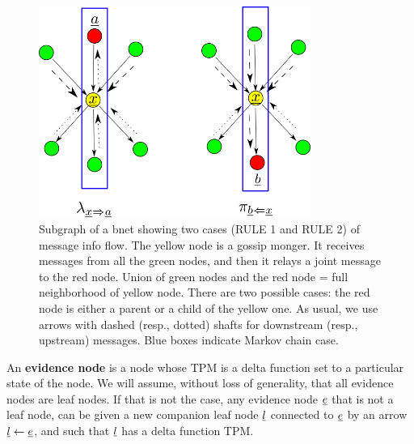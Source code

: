 \begin{figure}[h!]
\centering
\includegraphics[width=3.5in]
{mpass/mpass-messages.png}
\caption{
Subgraph of a bnet
showing two cases (RULE 1
 and RULE 2)
of message info flow.
The yellow
node is a gossip monger.
It receives messages from
all the green nodes,
and then it relays a joint
message to the red node.
Union of green nodes and the red node = full
 neighborhood of yellow node.
There are two possible
cases: the
red node is either a parent
or a child of the yellow
one. As usual, we use arrows with
dashed (resp., dotted) shafts for
downstream (resp., upstream) messages. 
Blue boxes indicate Markov chain case. }
\label{fig-messages-gen}
\end{figure}

An {\bf evidence node} is a
node whose TPM is a delta function
set to a particular state of the node. 
We will assume, without loss of generality,
that all evidence nodes are leaf nodes.
If that is not the case, 
any
evidence node $\rve$
that is not
a leaf node,
can be given a new
companion leaf node $\rvl$
connected to $\rve$ by 
an arrow $\rvl\larrow \rve$,
and such that
$\rvl$ has a delta
function TPM.



